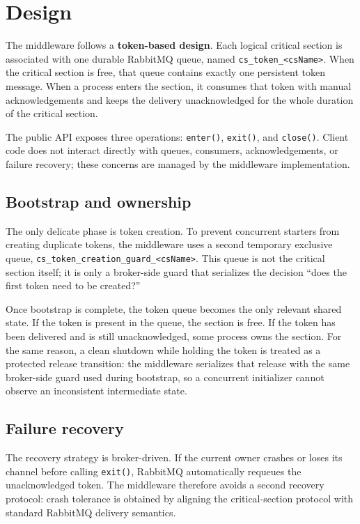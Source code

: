 \clearpage
\section{Design}

The middleware follows a \textbf{token-based design}. Each logical critical
section is associated with one durable RabbitMQ queue, named
\texttt{cs\_token\_<csName>}. When the critical section is free, that queue
contains exactly one persistent token message. When a process enters the
section, it consumes that token with manual acknowledgements and keeps the
delivery unacknowledged for the whole duration of the critical section.

The public API exposes three operations: \texttt{enter()}, \texttt{exit()}, and
\texttt{close()}. Client code does not interact directly with queues,
consumers, acknowledgements, or failure recovery; these concerns are managed by
the middleware implementation.

\subsection{Bootstrap and ownership}

The only delicate phase is token creation. To prevent concurrent starters from
creating duplicate tokens, the middleware uses a second temporary exclusive
queue, \texttt{cs\_token\_creation\_guard\_<csName>}. This queue is not the
critical section itself; it is only a broker-side guard that serializes the
decision ``does the first token need to be created?''

Once bootstrap is complete, the token queue becomes the only relevant shared
state. If the token is present in the queue, the section is free. If the token
has been delivered and is still unacknowledged, some process owns the section.
For the same reason, a clean shutdown while holding the token is treated as a
protected release transition: the middleware serializes that release with the
same broker-side guard used during bootstrap, so a concurrent initializer
cannot observe an inconsistent intermediate state.

\subsection{Failure recovery}

The recovery strategy is broker-driven. If the current owner crashes or loses
its channel before calling \texttt{exit()}, RabbitMQ automatically requeues the
unacknowledged token. The middleware therefore avoids a second recovery
protocol: crash tolerance is obtained by aligning the critical-section protocol
with standard RabbitMQ delivery semantics.
